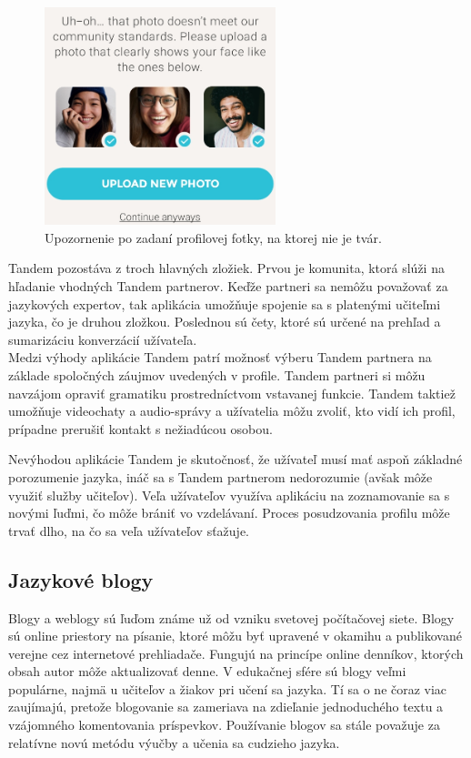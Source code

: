 \documentclass[10pt,oneside,slovak,a4paper]{article}
\begin{document}
\begin{figure}[h] %
\centering
\includegraphics[width=0.6\textwidth,height=0.3\textheight]{tandem2.png}
\caption{Upozornenie po zadaní profilovej fotky, na ktorej nie je tvár.}
\label{tandem-obmedzenia}
\end{figure}

Tandem pozostáva z troch hlavných zložiek. Prvou je komunita, ktorá slúži na hľadanie vhodných Tandem partnerov. Keďže partneri sa nemôžu považovať za jazykových expertov, tak aplikácia umožňuje spojenie sa s platenými učiteľmi jazyka, čo je druhou zložkou. Poslednou sú čety, ktoré sú určené na prehľad a sumarizáciu konverzácií užívateľa.\cite{tandem}\\

 Medzi výhody aplikácie Tandem patrí možnosť výberu Tandem partnera na základe spoločných záujmov uvedených v profile.
Tandem partneri si môžu navzájom opraviť gramatiku prostredníctvom vstavanej funkcie.
Tandem taktiež umožňuje videochaty a audio-správy a
užívatelia môžu zvoliť, kto vidí ich profil, prípadne prerušiť kontakt s nežiadúcou osobou. \cite{tandem}

Nevýhodou aplikácie Tandem je skutočnosť, že
užívateľ musí mať aspoň základné porozumenie jazyka, ináč sa s Tandem partnerom nedorozumie (avšak môže využiť služby učiteľov).
Veľa užívateľov využíva aplikáciu na zoznamovanie sa s novými ľuďmi, čo môže brániť vo vzdelávaní.
Proces posudzovania profilu môže trvať dlho, na čo sa veľa užívateľov sťažuje. \cite{tandem}

\subsection{Jazykové blogy} %

Blogy a weblogy sú ľuďom známe už od vzniku svetovej počítačovej siete. Blogy sú online priestory na písanie, ktoré môžu byť upravené v okamihu a publikované verejne cez internetové prehliadače. Fungujú na princípe online denníkov, ktorých obsah autor môže aktualizovať denne. V edukačnej sfére sú blogy veľmi  populárne, najmä u učiteľov a žiakov pri učení sa jazyka. Tí sa o ne čoraz viac zaujímajú, pretože blogovanie sa zameriava na zdieľanie jednoduchého textu a vzájomného komentovania príspevkov. Používanie blogov sa stále považuje za relatívne novú metódu výučby a učenia sa cudzieho jazyka. \cite{blog-mif}
\end{document}
